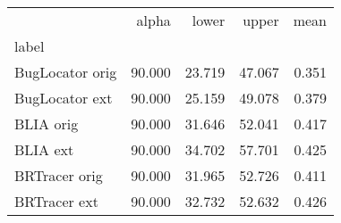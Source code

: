 \begin{tabular}{lrrrr}
\toprule
{} &  alpha &  lower &  upper &  mean \\
label           &        &        &        &       \\
\midrule
BugLocator orig & 90.000 & 23.719 & 47.067 & 0.351 \\
BugLocator ext  & 90.000 & 25.159 & 49.078 & 0.379 \\
BLIA orig       & 90.000 & 31.646 & 52.041 & 0.417 \\
BLIA ext        & 90.000 & 34.702 & 57.701 & 0.425 \\
BRTracer orig   & 90.000 & 31.965 & 52.726 & 0.411 \\
BRTracer ext    & 90.000 & 32.732 & 52.632 & 0.426 \\
\bottomrule
\end{tabular}
